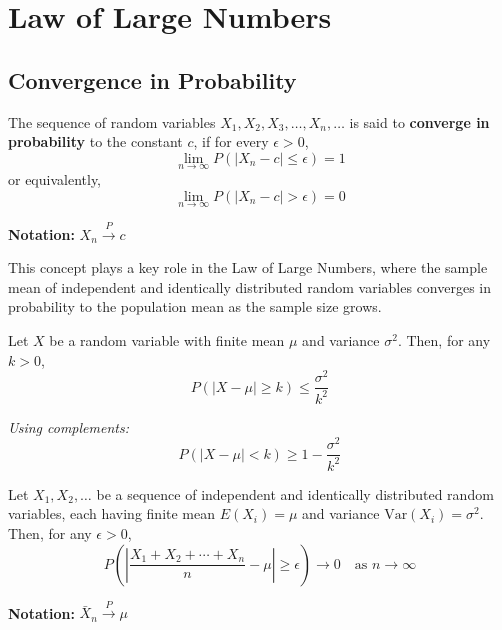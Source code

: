 \chapter{Law of Large Numbers}
\section{Convergence in Probability}

\vspace{1em}


\begin{definition}
The sequence of random variables \( X_1, X_2, X_3, \ldots, X_n, \ldots \) is said to \textbf{converge in probability} to the constant \( c \), if for every \( \epsilon > 0 \),
\[
\lim_{n \to \infty} P\left( |X_n - c| \leq \epsilon \right) = 1
\]
or equivalently,
\[
\lim_{n \to \infty} P\left( |X_n - c| > \epsilon \right) = 0
\]

\noindent \textbf{Notation:} \( X_n \xrightarrow{P} c \)
\end{definition}

\vspace{1em}

This concept plays a key role in the Law of Large Numbers, where the sample mean of independent and identically distributed random variables converges in probability to the population mean as the sample size grows.

\vspace{2em}

\begin{definition}
Let \( X \) be a random variable with finite mean \( \mu \) and variance \( \sigma^2 \). Then, for any \( k > 0 \),
\[
P\left( |X - \mu| \geq k \right) \leq \frac{\sigma^2}{k^2}
\]

\textit{Using complements:}
\[
P\left( |X - \mu| < k \right) \geq 1 - \frac{\sigma^2}{k^2}
\]
\end{definition}

\newpage

\vspace*{1em}

\begin{definition}
Let \( X_1, X_2, \ldots \) be a sequence of independent and identically distributed random variables, each having finite mean \( E(X_i) = \mu \) and variance \( \mathrm{Var}(X_i) = \sigma^2 \). Then, for any \( \epsilon > 0 \),
\[
P\left( \left| \frac{X_1 + X_2 + \cdots + X_n}{n} - \mu \right| \geq \epsilon \right) \to 0 \quad \text{as } n \to \infty
\]

\noindent\textbf{Notation:} \( \bar{X}_n \xrightarrow{P} \mu \)
\end{definition}
